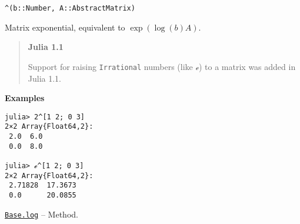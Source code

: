 \begin{adjustwidth}{2em}{0pt}


\begin{verbatim}
^(b::Number, A::AbstractMatrix)
\end{verbatim}

Matrix exponential, equivalent to \(\exp(\log(b)A)\).

\begin{quote}
\textbf{Julia 1.1}

Support for raising \texttt{Irrational} numbers (like \texttt{ℯ}) to a matrix was added in Julia 1.1.

\end{quote}
\textbf{Examples}


\begin{verbatim}
julia> 2^[1 2; 0 3]
2×2 Array{Float64,2}:
 2.0  6.0
 0.0  8.0

julia> ℯ^[1 2; 0 3]
2×2 Array{Float64,2}:
 2.71828  17.3673
 0.0      20.0855
\end{verbatim}



\end{adjustwidth}
\hypertarget{3808986897558314383}{} 
\hyperlink{3808986897558314383}{\texttt{Base.log}}  -- {Method.}

